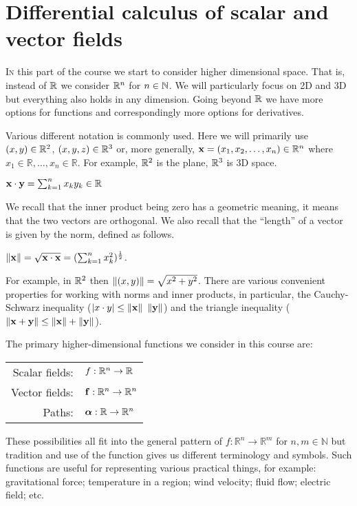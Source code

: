 

\chapter{Differential calculus of scalar and vector fields}

\lettrine{I}{n} this part of the course we start to consider higher dimensional space.
That is, instead of \(\mathbb{R}\) we consider \(\mathbb{R}^n\) for \(n\in \mathbb{N}\).
We will particularly focus on 2D and 3D but everything also holds in any dimension.
Going beyond \(\mathbb{R}\) we have more options for functions and correspondingly more options for derivatives.

Various different notation is commonly used.
Here we will primarily use \((x,y)\in \mathbb{R}^2\), \((x,y,z)\in\mathbb{R}^3\) or, more generally,  \(\mathbf{x} =(x_1,x_2,\ldots,x_n) \in \mathbb{R}^n \)
where
\( x_1 \in \mathbb{R},\ldots, x_n \in \mathbb{R}\).
For example, \(\mathbb{R}^2\) is the plane, \(\mathbb{R}^3\) is 3D space.

\begin{definition}
    \(\mathbf{x} \cdot \mathbf{y} = \sum_{k=1}^{n} x_k y_k \in \mathbb{R}\)
\end{definition}

\noindent
We recall that the inner product being zero has a geometric meaning, it means that the two vectors are orthogonal.
We also recall that the ``length'' of a vector is given by the norm, defined as follows.

\begin{definition}[norm]
    \(\left\|\mathbf{x}\right\| =  \sqrt{\mathbf{x} \cdot \mathbf{x}} = (\sum_{k=1}^{n} x_k^2 )^{\frac{1}{2}}\).
\end{definition}

\noindent
For example, in \(\mathbb{R}^2\) then \(\left\|(x,y)\right\| = \sqrt{x^2 + y^2}\).
There are various convenient properties for working with norms and inner products, in particular, the Cauchy-Schwarz inequality (\(\abs{x\cdot y} \leq \norm{\xx} \ \norm{\yy}\)) and the triangle inequality (\(\left\|\mathbf{x} + \mathbf{y}\right\| \leq \left\|\mathbf{x}\right\| + \left\|\mathbf{y}\right\|\)).

\begin{samepage}
    The primary higher-dimensional functions we consider in this course are:
    \begin{center}
        \begin{tabular}{r l}
            Scalar fields:
             &
            \(f:\mathbb{R}^n \to \mathbb{R}\)            \\
            Vector fields:
             &
            \(\mathbf{f}:\mathbb{R}^n \to \mathbb{R}^n\) \\
            Paths:
             &
            \(\boldsymbol{\alpha}:\mathbb{R} \to \mathbb{R}^n\)
        \end{tabular}
    \end{center}
\end{samepage}
\noindent
These possibilities all fit into the general pattern of \(f:\mathbb{R}^n \to \mathbb{R}^m\) for $n,m\in \mathbb{N}$ but tradition and use of the function gives us different terminology and symbols.
Such functions are useful for representing various practical things, for example:
gravitational force; temperature in a region; wind velocity; fluid flow; electric field; etc.



